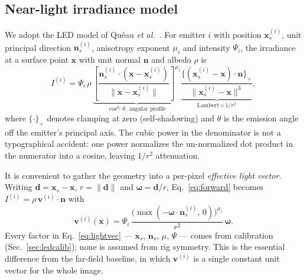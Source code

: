 \documentclass[journal,10pt]{IEEEtran}
\newcommand{\vecn}{\bm{n}}
\newcommand{\vecx}{\bm{x}}
\begin{document}
\subsection{Near-light irradiance model}\label{sec:forward}
We adopt the LED model of Qu\'eau \textit{et al.}~\cite{queau2018led}. For
emitter $i$ with position $\vecx_s^{(i)}$, unit principal direction
$\vecn_s^{(i)}$, anisotropy exponent $\mu_i$ and intensity $\Psi_i$, the
irradiance at a surface point $\vecx$ with unit normal $\vecn$ and albedo $\rho$
is
\begin{equation}
I^{(i)} = \Psi_i\,\rho\,
\underbrace{\left[\frac{\vecn_s^{(i)}\!\cdot(\vecx-\vecx_s^{(i)})}
                       {\lVert \vecx-\vecx_s^{(i)}\rVert}\right]^{\mu_i}}
          _{\cos^{\mu_i}\theta,\ \text{angular profile}}
\underbrace{\frac{\bigl\{(\vecx_s^{(i)}-\vecx)\cdot\vecn\bigr\}_+}
                 {\lVert\vecx_s^{(i)}-\vecx\rVert^{3}}}
          _{\text{Lambert} \times 1/r^2} ,
\label{eq:forward}
\end{equation}
where $\{\cdot\}_+$ denotes clamping at zero (self-shadowing) and $\theta$ is
the emission angle off the emitter's principal axis. The cubic power in the
denominator is not a typographical accident: one power normalizes the
un-normalized dot product in the numerator into a cosine, leaving $1/r^2$
attenuation.

It is convenient to gather the geometry into a per-pixel \emph{effective light
vector}. Writing $\bm{d} = \vecx_s - \vecx$, $r = \lVert\bm{d}\rVert$ and
$\bm{\omega} = \bm{d}/r$, Eq.~\eqref{eq:forward} becomes
$I^{(i)} = \rho\,\bm{v}^{(i)}\!\cdot\vecn$ with
\begin{equation}
\bm{v}^{(i)}(\vecx) = \Psi_i\,
\frac{\bigl(\max(-\bm{\omega}\cdot\vecn_s^{(i)},\,0)\bigr)^{\mu_i}}{r^{2}}\,
\bm{\omega} .
\label{eq:lightvec}
\end{equation}
Every factor in Eq.~\eqref{eq:lightvec} --- $\vecx_s$, $\vecn_s$, $\mu$, $\Psi$
--- comes from calibration (Sec.~\ref{sec:ledcalib}); none is assumed from rig
symmetry. This is the essential difference from the far-field baseline, in which
$\bm{v}^{(i)}$ is a single constant unit vector for the whole image.
\end{document}
